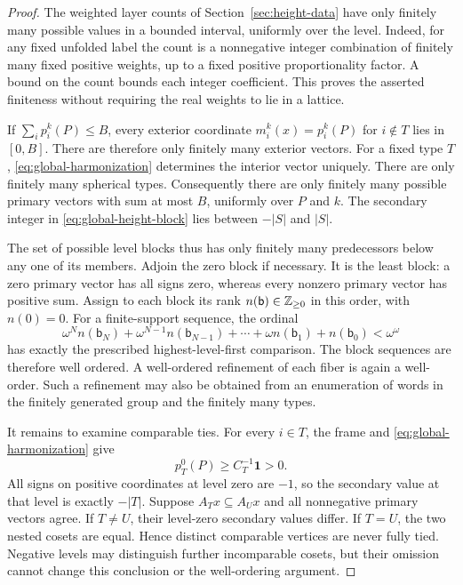\begin{proof}
The weighted layer counts of Section~\ref{sec:height-data} have only
finitely many possible values in a bounded interval, uniformly over the
level.  Indeed, for any fixed unfolded label the count is a nonnegative
integer combination of finitely many fixed positive weights, up to a
fixed positive proportionality factor.  A bound on the count bounds each
integer coefficient.  This proves the asserted finiteness without
requiring the real weights to lie in a lattice.

If $\sum_i p_i^k(P)\le B$, every exterior coordinate
$m_i^k(x)=p_i^k(P)$ for $i\notin T$ lies in $[0,B]$.  There are therefore
only finitely many exterior vectors.  For a fixed type $T$,
\eqref{eq:global-harmonization} determines the interior vector uniquely.
There are only finitely many spherical types.  Consequently there are
only finitely many possible primary vectors with sum at most $B$,
uniformly over $P$ and $k$.  The secondary integer in
\eqref{eq:global-height-block} lies between $-|S|$ and $|S|$.

The set of possible level blocks thus has only finitely many predecessors
below any one of its members.  Adjoin the zero block if necessary.  It is
the least block: a zero primary vector has all signs zero, whereas every
nonzero primary vector has positive sum.  Assign to each block its rank
$n(\mathsf b)\in\mathbb Z_{\ge0}$ in this order, with $n(0)=0$.  For a
finite-support sequence, the ordinal
\[
 \omega^N n(\mathsf b_N)+\omega^{N-1}n(\mathsf b_{N-1})
       +\cdots+\omega n(\mathsf b_1)+n(\mathsf b_0)
       <\omega^\omega
\]
has exactly the prescribed highest-level-first comparison.  The block
sequences are therefore well ordered.  A well-ordered refinement of each
fiber is again a well-order.  Such a refinement may also be obtained from
an enumeration of words in the finitely generated group and the finitely
many types.

It remains to examine comparable ties.  For every $i\in T$, the frame
and \eqref{eq:global-harmonization} give
\begin{equation}\label{eq:global-level-zero-positive}
 p_T^0(P)\ge C_T^{-1}\mathbf1>0.
\end{equation}
All signs on positive coordinates at level zero are $-1$, so the
secondary value at that level is exactly $-|T|$.  Suppose
$A_Tx\subseteq A_Ux$ and all nonnegative primary vectors agree.
If $T\ne U$, their level-zero secondary values differ.  If $T=U$,
the two nested cosets are equal.  Hence distinct comparable vertices are
never fully tied.  Negative levels may distinguish further incomparable
cosets, but their omission cannot change this conclusion or the
well-ordering argument.
\end{proof}

